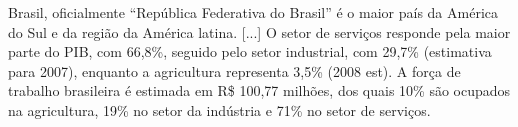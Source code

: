 \documentclass{article}
\begin{document}



Brasil, oficialmente ``República Federativa do Brasil''  é o maior país da
América do Sul e da região da América latina. [...] O setor de serviços responde pela
maior parte do PIB, com 66,8\%, seguido pelo setor industrial, com 29,7\%
(estimativa para 2007), enquanto a agricultura representa 3,5\% (2008 est). A
força de trabalho brasileira é estimada em R\$ 100,77 milhões, dos quais 10\%
são ocupados na agricultura, 19\% no setor da indústria e 71\% no setor de
serviços.
\end{document}
